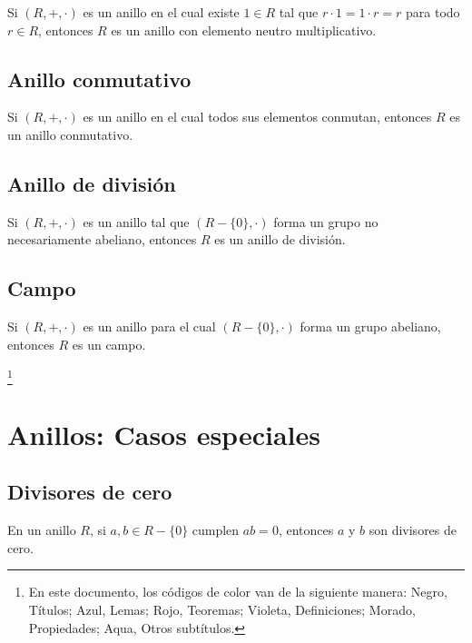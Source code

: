 \documentclass{article}
\newcommand\blfootnote[1]{%
  \begingroup
  \renewcommand\thefootnote{}\footnote{#1}%
  \addtocounter{footnote}{-1}%
  \endgroup
}
\renewcommand{\headrulewidth}{2pt}
\begin{document}
Si $(R,+,\cdot)$ es un anillo en el cual existe $1\in R$ tal que $r\cdot1=1\cdot r=r$ para todo $r\in R$, entonces $R$ es un anillo con elemento neutro multiplicativo.

\subsection*{\color{violet} Anillo conmutativo}

Si $(R,+,\cdot)$ es un anillo en el cual todos sus elementos conmutan, entonces $R$ es un anillo conmutativo.

\subsection*{\color{violet} Anillo de división}

Si $(R,+,\cdot)$ es un anillo tal que $(R-\{0\},\cdot)$ forma un grupo no necesariamente abeliano, entonces $R$ es un anillo de división.

\subsection*{\color{violet} Campo}

Si $(R,+,\cdot)$ es un anillo para el cual $(R-\{0\},\cdot)$ forma un grupo abeliano, entonces $R$ es un campo.

\blfootnote{En este documento, los códigos de color van de la siguiente manera: Negro, Títulos; \color{blue} Azul, Lemas; \color{red} Rojo, Teoremas; \color{violet} Violeta, Definiciones; \color{purple} Morado, Propiedades; \color{teal} Aqua, Otros subtítulos.}

\newpage
\pagestyle{fancy}
\fancyhf{}
\renewcommand{\headrulewidth}{2pt}
\fancyfoot{}
\rfoot{\thepage}
\lfoot{}
\setlength{\headheight}{28pt}

\section{Anillos: Casos especiales}

\subsection*{\color{violet} Divisores de cero}

En un anillo $R$, si $a,b\in R-\{0\}$ cumplen $ab=0$, entonces $a$ y $b$ son divisores de cero.
\end{document}
